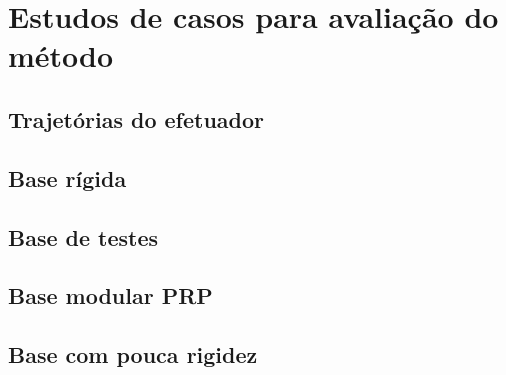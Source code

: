 \section{Estudos de casos para avaliação do método}

\subsection{Trajetórias do efetuador}

\subsection{Base rígida}

\subsection{Base de testes}

\subsection{Base modular PRP}

\subsection{Base com pouca rigidez}
